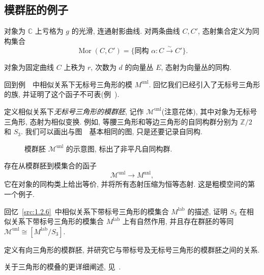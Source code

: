 \subsection{模群胚的例子}\label{src:1.4.3-subsection}
\begin{example}[光滑曲线的模群胚]\label{src:1.4.17}
对象为 $\mathbb C$ 上亏格为 $g$ 的光滑, 连通射影曲线. 对两条曲线 $C,C'$, 态射集合定义为同构集合
\[
\operatorname{Mor}(C,C')=\{\text{同构 }\alpha:C\xrightarrow{\sim}C'\}.
\]
\end{example}
\begin{example}[曲线上向量丛的模群胚]\label{src:1.4.18}
对象为固定曲线 $C$ 上秩为 $r$, 次数为 $d$ 的向量丛 $E$, 态射为向量丛的同构.
\end{example}
\begin{example}[无标号三角形的模群胚]\label{src:1.4.19}
回到例~~中相似关系下无标号三角形的模 $M^{\mathrm{unl}}$. 回忆我们已经引入了无标号三角形的族, 并证明了这个函子不可表(例~).

定义相似关系下\textit{无标号三角形的模群胚}, 记作 $\mathcal M^{\mathrm{unl}}$(注意花体), 其中对象为无标号三角形, 态射为相似变换. 例如, 等腰三角形和等边三角形的自同构群分别为 $\mathbb Z/2$ 和 $S_3$. 我们可以画出与图~~基本相同的图, 只是还要记录自同构.
\end{example}
\begin{figure}[htbp]
\centering
\caption{模群胚 $\mathcal M^{\mathrm{unl}}$ 的示意图, 标出了非平凡自同构群.}\label{src:1.4.20}
\end{figure}
存在从模群胚到模集合的函子
\[
\mathcal M^{\mathrm{unl}}\longrightarrow M^{\mathrm{unl}},
\]
它在对象的同构类上给出等价, 并将所有态射压缩为恒等态射. 这是粗模空间的第一个例子.
\begin{exercise}\label{src:1.4.21}
回忆~\eqref{src:1.2.6}~中相似关系下带标号三角形的模集合 $M^{\mathrm{lab}}$ 的描述, 证明 $S_3$ 在相似关系下带标号三角形的模集合 $M^{\mathrm{lab}}$ 上有自然作用, 并且存在群胚的等同 $\mathcal M^{\mathrm{unl}}\cong[M^{\mathrm{lab}}/S_3]$.
\end{exercise}
\begin{exercise}\label{src:1.4.22}
定义有向三角形的模群胚, 并研究它与带标号及无标号三角形的模群胚之间的关系.
\end{exercise}
关于三角形的模叠的更详细阐述, 见~\cite{Beh14}.
